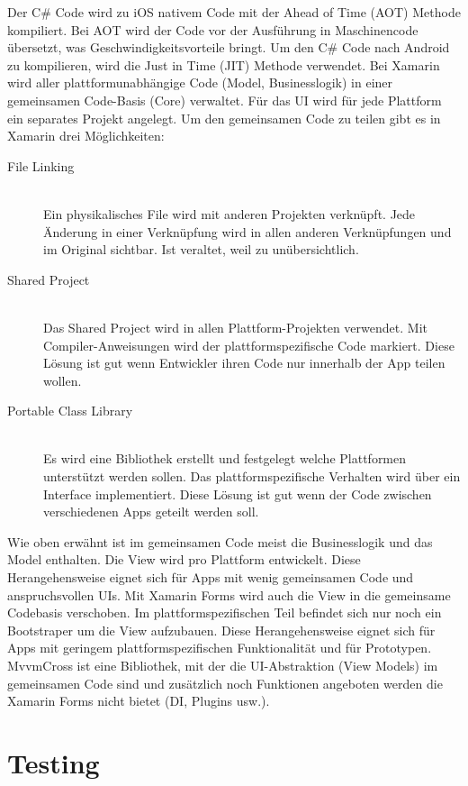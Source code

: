 Der C\# Code wird zu iOS nativem Code mit der Ahead of Time (AOT) Methode kompiliert. Bei AOT wird der Code vor der Ausführung in Maschinencode übersetzt, was Geschwindigkeitsvorteile bringt. Um den C\# Code nach Android zu kompilieren, wird die Just in Time (JIT) Methode verwendet. Bei Xamarin wird aller plattformunabhängige Code (Model, Businesslogik) in einer gemeinsamen Code-Basis (Core) verwaltet. Für das UI wird für jede Plattform ein separates Projekt angelegt. Um den gemeinsamen Code zu teilen gibt es in Xamarin drei Möglichkeiten:
\begin{description}
	\item[File Linking] \hfill \\
	Ein physikalisches File wird mit anderen Projekten verknüpft. Jede Änderung in einer Verknüpfung wird in allen anderen Verknüpfungen und im Original sichtbar. Ist veraltet, weil zu unübersichtlich.
	\item[Shared Project] \hfill \\
	Das Shared Project wird in allen Plattform-Projekten verwendet. Mit Compiler-Anweisungen wird der plattformspezifische Code markiert. Diese Lösung ist gut wenn Entwickler ihren Code nur innerhalb der App teilen wollen.
	\item[Portable Class Library] \hfill \\
	Es wird eine Bibliothek erstellt und festgelegt welche Plattformen unterstützt werden sollen. Das plattformspezifische Verhalten wird über ein Interface implementiert. Diese Lösung ist gut wenn der Code zwischen verschiedenen Apps geteilt werden soll.
\end{description}
Wie oben erwähnt ist im gemeinsamen Code meist die Businesslogik und das Model enthalten. Die View wird pro Plattform entwickelt. Diese Herangehensweise eignet sich für Apps mit wenig gemeinsamen Code und anspruchsvollen UIs. Mit Xamarin Forms wird auch die View in die gemeinsame Codebasis verschoben. Im plattformspezifischen Teil befindet sich nur noch ein Bootstraper um die View aufzubauen. Diese Herangehensweise eignet sich für Apps mit geringem plattformspezifischen Funktionalität und für Prototypen.
MvvmCross ist eine Bibliothek, mit der die UI-Abstraktion (View Models) im gemeinsamen Code sind und zusätzlich noch Funktionen angeboten werden die Xamarin Forms nicht bietet (DI, Plugins usw.).

\section{Testing}

